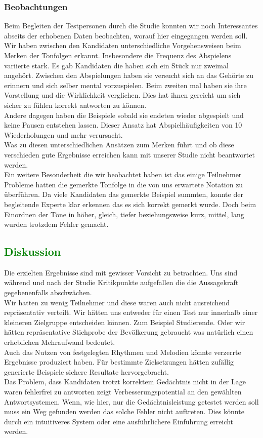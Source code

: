 \documentclass{acm_proc_article-sp}
\begin{document}
\subsubsection{Beobachtungen}
Beim Begleiten der Testpersonen durch die Studie konnten wir noch Interessantes abseits der erhobenen Daten beobachten, worauf hier eingegangen werden soll.\\

Wir haben zwischen den Kandidaten unterschiedliche Vorgehensweisen beim Merken der Tonfolgen erkannt. Insbesondere die Frequenz des Abspielens variierte stark. Es gab Kandidaten die haben sich ein Stück nur zweimal angehört. Zwischen den Abspielungen haben sie versucht sich an das Gehörte zu erinnern und sich selber mental vorzuspielen. Beim zweiten mal haben sie ihre Vorstellung und die Wirklichkeit verglichen. Dies hat ihnen gereicht um sich sicher zu fühlen korrekt antworten zu können.\\
Andere dagegen haben die Beispiele sobald sie endeten wieder abgespielt und keine Pausen entstehen lassen. Dieser Ansatz hat Abspielhäufigkeiten von 10 Wiederholungen und mehr verursacht.\\ 
Was zu diesen unterschiedlichen Ansätzen zum Merken führt und ob diese verschieden gute Ergebnisse erreichen kann mit unserer Studie nicht beantwortet werden.\\

Ein weitere Besonderheit die wir beobachtet haben ist das einige Teilnehmer Probleme hatten die gemerkte Tonfolge in die von uns erwartete Notation zu überführen. Da viele Kandidaten das gemerkte Beispiel summten, konnte der begleitende Experte klar erkennen das es sich korrekt gemerkt wurde. Doch beim Einordnen der Töne in höher, gleich, tiefer beziehungsweise kurz, mittel, lang wurden trotzdem Fehler gemacht.
\subsection{\textcolor{green}{Diskussion}}
Die erzielten Ergebnisse sind mit gewisser Vorsicht zu betrachten. Uns sind während und nach der Studie Kritikpunkte aufgefallen die die Aussagekraft gegebenenfalls abschwächen.\\
Wir hatten zu wenig Teilnehmer und diese waren auch nicht ausreichend repräsentativ verteilt. Wir hätten uns entweder für einen Test nur innerhalb einer kleineren Zielgruppe entscheiden können. Zum Beispiel Studierende. Oder wir hätten repräsentative Stichprobe der Bevölkerung gebraucht was natürlich einen erheblichen Mehraufwand bedeutet.\\
Auch das Nutzen von festgelegten Rhythmen und Melodien könnte verzerrte Ergebnisse produziert haben. Für bestimmte Zielsetzungen hätten zufällig generierte Beispiele sichere Resultate hervorgebracht.\\
Das Problem, dass Kandidaten trotzt korrektem Gedächtnis nicht in der Lage waren fehlerfrei zu antworten zeigt Verbesserungspotential an den gewählten Antwortsystemen. Wenn, wie hier, nur die Gedächtnisleistung getestet werden soll muss ein Weg gefunden werden das solche Fehler nicht auftreten. Dies könnte durch ein intuitiveres System oder eine ausführlichere Einführung erreicht werden.\\
\end{document}
